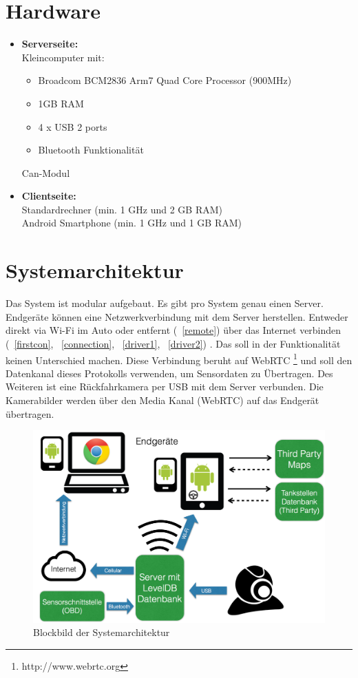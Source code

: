 \documentclass[pflichtenheft.tex]{subfiles}
\begin{document}
\section{Hardware}
\begin{itemize}
\item
\textbf{Serverseite:}\\
Kleincomputer mit:
\begin{itemize}
\item
Broadcom BCM2836 Arm7 Quad Core Processor (900MHz)
\item
1GB RAM
\item
4 x USB 2 ports
\item
Bluetooth Funktionalität
\end{itemize}
Can-Modul
\item
\textbf{Clientseite:}\\
Standardrechner (min. 1 GHz und 2 GB RAM)\\
Android Smartphone (min. 1 GHz und 1 GB RAM)
\end{itemize}


\section{Systemarchitektur}

Das System ist modular aufgebaut. Es gibt pro System genau einen Server. Endgeräte können eine Netzwerkverbindung mit dem Server herstellen. Entweder direkt via Wi-Fi im Auto oder entfernt (~\ref{remote}) über das Internet verbinden (~\ref{firstcon}, ~\ref{connection}, ~\ref{driver1}, ~\ref{driver2}) . Das soll in der Funktionalität keinen Unterschied machen. Diese Verbindung beruht auf WebRTC \footnote{http://www.webrtc.org} und soll den Datenkanal dieses Protokolls verwenden, um Sensordaten zu Übertragen. Des Weiteren ist eine Rückfahrkamera per USB mit dem Server verbunden. Die Kamerabilder werden über den Media Kanal (WebRTC) auf das Endgerät übertragen.

\begin{figure}[H]
  	\begin{center}
 		\includegraphics[width=\textwidth]{Images/sysarch.png}
  		\caption{Blockbild der Systemarchitektur}
  	\end{center}
\end{figure}
\end{document}
